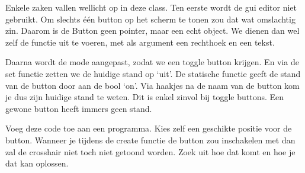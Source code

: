 Enkele zaken vallen wellicht op in deze class. Ten eerste wordt de gui editor niet gebruikt. Om slechts \'e\'en button op het scherm te tonen zou dat wat omslachtig zin. Daarom is de Button geen pointer, maar een echt object. We dienen dan wel zelf de functie  uit te voeren, met als argument een rechthoek en een tekst.

Daarna wordt de mode aangepast, zodat we een toggle button krijgen. En via de set functie zetten we de huidige stand op `uit'. De statische functie  geeft de stand van de button door aan de bool `on'. Via haakjes na de naam van de button kom je dus zijn huidige stand te weten. Dit is enkel zinvol bij toggle buttons. Een gewone button heeft immers geen stand.

\begin{exercise}
Voeg deze code toe aan een programma. Kies zelf een geschikte positie voor de button. Wanneer je tijdens de create functie de button zou inschakelen met  dan zal de crosshair niet toch niet getoond worden. Zoek uit hoe dat komt en hoe je dat kan oplossen.
\end{exercise}